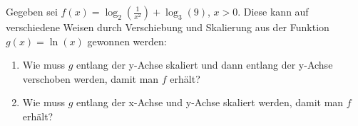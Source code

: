 \item Gegeben sei $f(x) = \log_2\left(\frac{1}{x^2}\right)+\log_3(9)$, $x>0$. Diese kann auf verschiedene Weisen durch Verschiebung und Skalierung aus der Funktion $g(x) = \ln(x)$ gewonnen werden:

\begin{enumerate}
\item Wie muss $g$ entlang der y-Achse skaliert und dann entlang der y-Achse verschoben werden, damit man $f$ erhält?
\item Wie muss $g$ entlang der x-Achse und y-Achse skaliert werden, damit man $f$ erhält?
\end{enumerate} 
